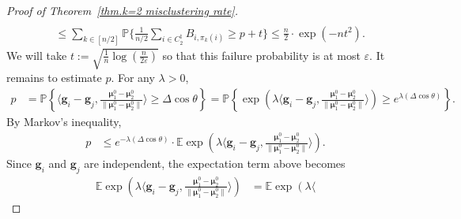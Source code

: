 \documentclass{article}
\theoremstyle{plain}
\theoremstyle{definition}
\newcommand{\1}{\mathbf{1}}
\newcommand{\bmu}{\bm{\mu}}
\begin{document}
\begin{proof}[Proof of Theorem~\ref{thm.k=2 misclustering rate}]
\begin{align*}
\\
& \le \sum_{k\in[n/2]} \mathbb{P}\bigg\{ \frac{1}{n/2} \sum_{i\in C_2^\natural} B_{i,\pi_k(i)} \ge p + t \bigg\}
\le \frac{n}{2}\cdot \exp(-nt^2).
\end{align*}
We will take $t:=\sqrt{\frac{1}{n}\log\left(\frac{n}{2\varepsilon}\right)}$ so that this failure probability is at most $\varepsilon$.
It remains to estimate $p$.
For any $\lambda>0$, 
\begin{align*}
    p &= \mathbb{P}\left\{ \bigg\langle 
    \bm{g}_i - \bm{g}_j,\frac{\bmu^0_1 - \bmu^0_2}{\| \bmu^0_1 - \bmu^0_2 \|} \bigg\rangle \ge \Delta\cos\theta
    \right\} =  \mathbb{P}\left\{
    \exp\left(
    \lambda
    \bigg\langle 
    \bm{g}_i - \bm{g}_j,\frac{\bmu^0_1 - \bmu^0_2}{\| \bmu^0_1 - \bmu^0_2 \|} \bigg\rangle
    \right)
    \ge e^{\lambda(\Delta\cos\theta)}
    \right\}. 
\end{align*}
By Markov's inequality, 
\begin{align*}
    p&\le e^{-\lambda(\Delta\cos\theta)}\cdot \mathbb{E}
        \exp\left(
        \lambda
        \bigg\langle 
        \bm{g}_i - \bm{g}_j,\frac{\bmu^0_1 - \bmu^0_2}{\| \bmu^0_1 - \bmu^0_2 \|} \bigg\rangle
    \right).
\end{align*}
Since $\bm{g}_i$ and $\bm{g}_j$ are independent, the expectation term above becomes
\begin{align*}
    \mathbb{E}
        \exp\left(
        \lambda
        \bigg\langle 
        \bm{g}_i - \bm{g}_j,\frac{\bmu^0_1 - \bmu^0_2}{\| \bmu^0_1 - \bmu^0_2 \|} \bigg\rangle
    \right)
     & = \mathbb{E}
        \exp\left(
        \lambda
        \bigg\langle 

\end{align*}
\end{proof}
\end{document}
